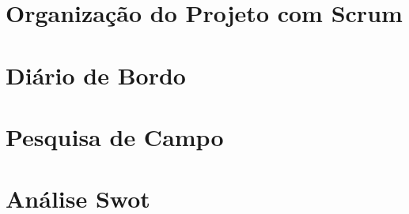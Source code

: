 \documentclass[
    a4paper,
    12pt,
    english,
    brazilian
]{article}
\begin{document}
\section{Organização do Projeto com Scrum}
\medskip
    \label{sect:Scrum}
    

\section{Diário de Bordo}
\medskip
    \label{sect:Diario-de-Bordo}
    

\section{Pesquisa de Campo}
\medskip
    \label{sect:Pesquisa-de-Campo}
    

\section{Análise Swot}
\medskip
    \label{sect:Analise-Swot}
    

\clearpage
\end{document}
